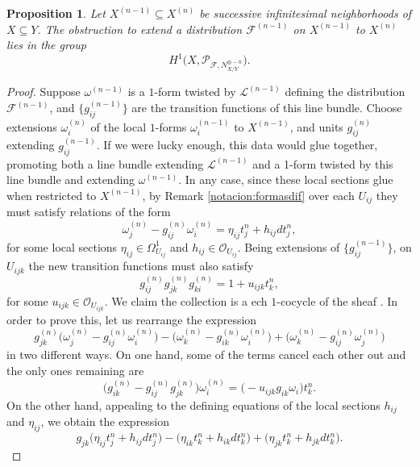\documentclass[reqno]{amsart}
\theoremstyle{plain}
\newcommand{\OO}{\mathcal{O}}
\renewcommand{\L}{\mathcal{L}}
\newcommand{\F}{\mathscr{F}}
\newcommand{\PP}{\mathcal{P}}
\newtheorem{proposition}[theorem]{Proposition}
\theoremstyle{definition}
\theoremstyle{named}
\begin{document}
\begin{proposition} \label{obst:dist}
Let $X^{(n-1)}\subseteq X^{(n)}$ be successive infinitesimal neighborhoods of $X\subseteq Y$. The obstruction to extend a distribution $\F^{(n-1)}$ on $X^{(n-1)}$ to $X^{(n)}$ lies in the group
\[
H^1\Big(X, \PP_{\F,N_{X/Y}^{\otimes - n}}\Big).
\]
\end{proposition}
\begin{proof} Suppose $\omega^{(n-1)}$ is a $1$-form twisted by $\L^{(n-1)}$ defining the distribution $\F^{(n-1)}$, and $\big\{g_{ij}^{(n-1)}\big\}$ are the transition functions of this line bundle. Choose extensions $\omega_i^{(n)}$ of the local $1$-forms $\omega_i^{(n-1)}$ to $X^{(n-1)}$, and units $g_{ij}^{(n)}$ extending $g_{ij}^{(n-1)}$. If we were lucky enough, this data would glue together, promoting both a line bundle extending $\L^{(n-1)}$ and a 1-form twisted by this line bundle and extending $\omega^{(n-1)}$. In any case, since these local sections glue when restricted to $X^{(n-1)}$, by Remark \ref{notacion:formasdif} over each $U_{ij}$ they must satisfy relations of the form
\begin{equation}\label{Obstructions:eq1}
\omega^{(n)}_j - g_{ij}^{(n)}\omega_i^{(n)} = \eta_{ij} t_j^n+ h_{ij}dt_j^n,
\end{equation}
for some local sections $\eta_{ij}\in \Omega^1_{U_{ij}}$ and $h_{ij}\in \OO_{U_{ij}}$.
Being extensions of $\{g_{ij}^{(n-1)} \}$, on $U_{ijk}$ the new transition functions must also satisfy
\begin{equation}\label{Obstructions:eq2}
g_{ij}^{(n)}g_{jk}^{(n)}g_{ki}^{(n)} = 1 + u_{ijk}t_k^n,
\end{equation}
for some $u_{ijk}\in\OO_{U_{ijk}}$.
We claim the collection  is a ech $1$-cocycle of the sheaf \smash{$\PP_{\F,N_{X/Y}^{\otimes - n}}$}. In order to prove this, let us rearrange the expression 
\[
g_{jk}^{(n)}\big(\omega_j^{(n)}-g_{ij}^{(n)}\omega_i^{(n)}\big) - \big(\omega_k^{(n)}-g_{ik}^{(n)}\omega_i^{(n)}\big) + \big(\omega_k^{(n)}-g_{ij}^{(n)}\omega_j^{(n)}\big)
\]
in two different ways. On one hand, some of the terms cancel each other out and the only ones remaining are
\[
\Big(g_{ik}^{(n)} - g_{ij}^{(n)}g_{jk}^{(n)}\Big) \omega_i^{(n)} = \Big(-u_{ijk}g_{ik}\omega_i\Big)t_k^n.
\]
On the other hand, appealing to the defining equations of the local sections $h_{ij}$ and $\eta_{ij}$, we obtain the expression
\[
g_{jk}\big(\eta_{ij} t_j^n+ h_{ij}dt_j^n\big) - \big(\eta_{ik} t_k^n + h_{ik}dt_k^n\big) + \big(\eta_{jk} t_k^n + h_{jk}dt_k^n\big).
\]
\end{proof}
\end{document}
